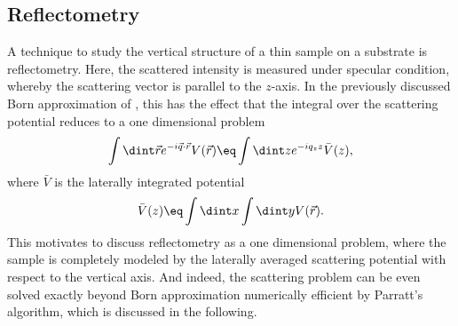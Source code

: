 \documentclass[\main/dresen_thesis.tex]{subfiles}
\begin{document}
  \subsection{Reflectometry}
    \label{sec:theoreticalBackground:scattering:reflectometry}
    \label{ch:appendix:numericalMethods:parrat}
    A technique to study the vertical structure of a thin sample on a substrate is reflectometry.
    Here, the scattered intensity is measured under specular condition, whereby the scattering vector is parallel to the $\mathit{z}$-axis.
    In the previously discussed Born approximation of , this has the effect that the integral over the scattering potential reduces to a one dimensional problem
    \begin{align}
      \int \dint \vec{r} e^{-i\vec{q} \cdot \vec{r}} V (\vec{r}) \eq \int \dint z e^{-i q_z z} \bar{V} (z),
    \end{align}
    where $\bar{V}$ is the laterally integrated potential
    \begin{align}
      \bar{V}(z) \eq \int \dint x \int \dint y V(\vec{r}).
    \end{align}
    This motivates to discuss reflectometry as a one dimensional problem, where the sample is completely modeled by the laterally averaged scattering potential with respect to the vertical axis.
    And indeed, the scattering problem can be even solved exactly beyond Born approximation numerically efficient by Parratt's algorithm, which is discussed in the following.
\end{document}
